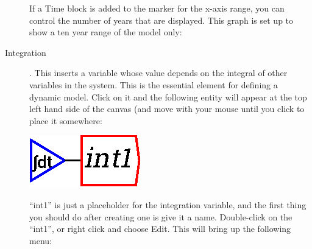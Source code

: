\begin{description}
If a Time block is added to the marker for the x-axis range, you can
control the number of years that are displayed. This graph is set up
to show a ten year range of the model only: 

\begin{center}
\end{center}



\item[Integration] .\label{Integrate}
  This inserts a variable whose value depends on the integral of other
  variables in the system. This is the essential element for defining
  a dynamic model. Click on it and the following entity will appear at
  the top left hand side of the canvas (and move with your mouse until
  you click to place it somewhere:

\begin{center}
\includegraphics{images/NewItem39.eps}
\end{center}

``int1'' is just a placeholder for the integration variable, and the
first thing you should do after creating one is give it a
name. Double-click on the ``int1'', or right click and choose
Edit. This will bring up the following menu:

\begin{center}
\end{center}


\end{description}
